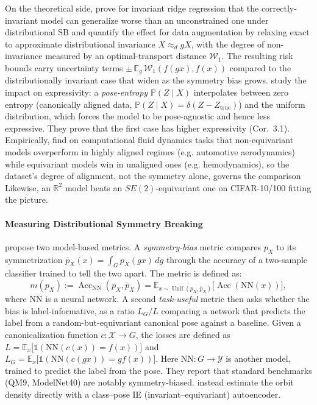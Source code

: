 \documentclass[mathematics,review,submit,moreauthors]{Definitions/mdpi}
\begin{document}
On the theoretical side, \citet{lawrence2026} prove for invariant ridge regression that the correctly-invariant model can generalize worse than an unconstrained one under distributional SB and \citet{chen2020} quantify the effect for data augmentation by relaxing exact to approximate distributional invariance $X\approx_d gX$, with the degree of non-invariance measured by an optimal-transport distance $\mathcal{W}_1$.
The resulting risk bounds carry uncertainty terms $\pm\,\mathbb{E}_g\,\mathcal{W}_1(f(gx),f(x))$ compared to the distributionally invariant case that widen as the symmetry bias grows.
\citet{vadgama2025} study the impact on expressivity: a \emph{pose-entropy} $\mathbb{P}(Z\mid X)$ interpolates between zero entropy (canonically aligned data, $\mathbb{P}(Z\mid X)=\delta(Z-Z_{\mathrm{true}})$) and the uniform distribution, which forces the model to be pose-agnostic and hence less expressive.
They prove that the first case has higher expressivity (Cor.~3.1).
Empirically, \citet{rygiel2026} find on computational fluid dynamics tasks that non-equivariant models overperform in highly aligned regimes (e.g. automotive aerodynamics) while equivariant models win in unaligned ones (e.g. hemodynamics), so the dataset's degree of alignment, not the symmetry alone, governs the comparison
Likewise, an $\mathbb{R}^2$ model beats an $SE(2)$-equivariant one on CIFAR-10/100 \citep[Tab.~4]{romero2023} fitting the picture.

\paragraph{Measuring Distributional Symmetry Breaking}
\citet{lawrence2026} propose two model-based metrics.
A \emph{symmetry-bias} metric compares $p_X$ to its symmetrization $\bar p_X(x)=\int_G p_X(gx)\,dg$ through the accuracy of a two-sample classifier trained to tell the two apart.
The metric is defined as:
$$m(p_X):=\operatorname{Acc}_{\mathrm{NN}}(p_X, \bar p_X)=\mathbb{E}_{x\sim \operatorname{Unif}(p_X, \bar p_X)}\big[\operatorname{Acc}(\mathrm{NN}(x))\big],$$
where $\mathrm{NN}$ is a neural network.
A second \emph{task-useful} metric then asks whether the bias is label-informative, as a ratio $L_G/L$ comparing a network that predicts the label from a random-but-equivariant canonical pose against a baseline.
Given a canonicalization function $c:\mathcal{X}\to G$, the losses are defined as $L=\mathbb{E}_x\big[\mathbb{1}(\mathrm{NN}(c(x))=f(x))\big]$ and $L_G=\mathbb{E}_x\big[\mathbb{1}(\mathrm{NN}(c(gx))=gf(x))\big]$. Here $\mathrm{NN}:G\to\mathcal{Y}$ is another model, trained to predict the label from the pose.
They report that standard benchmarks (QM9, ModelNet40) are notably symmetry-biased.
\citet{urbano2026} instead estimate the orbit density directly with a class--pose IE (invariant--equivariant) autoencoder.
\end{document}
